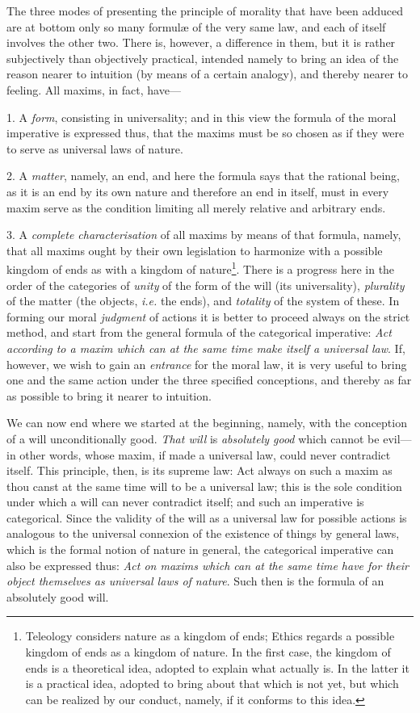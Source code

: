 The three modes of presenting the principle of morality that have been
adduced are at bottom only so many formul\ae{} of the very same law,
and each of itself involves the other two. There is, however, a
difference in them, but it is rather subjectively than objectively
practical, intended namely to bring an idea of the reason nearer to
intuition (by means of a certain analogy), and thereby nearer to
feeling. All maxims, in fact, have---

1. A \textit{form}, consisting in universality; and in this view the
formula of the moral imperative is expressed thus, that the maxims
must be so chosen as if they were to serve as universal laws of
nature.

2. A \textit{matter}, namely, an end, and here the formula
says that the rational being, as it is an end by its own nature and
therefore an end in itself, must in every maxim serve as the condition
limiting all merely relative and arbitrary ends.

3. A \textit{complete characterisation} of all maxims by means of that
formula, namely, that all maxims ought by their own legislation to
harmonize with a possible kingdom of ends as with a kingdom of
nature\footnote{Teleology considers nature as a kingdom of ends;
Ethics regards a possible kingdom of ends as a kingdom of nature. In
the first case, the kingdom of ends is a theoretical idea, adopted to
explain what actually is. In the latter it is a practical idea,
adopted to bring about that which is not yet, but which can be
realized by our conduct, namely, if it conforms to this idea.}. There
is a progress here in the order of the categories of \textit{unity} of
the form of the will (its universality), \textit{plurality} of the
matter (the objects, \textit{i.e.} the ends), and \textit{totality} of
the system of these. In forming our moral \textit{judgment} of actions
it is better to proceed always on the strict method, and start from
the general formula of the categorical imperative: \textit{Act
according to a maxim which can at the same time make itself a
universal law}. If, however, we wish to gain an \textit{entrance} for
the moral law, it is very useful to bring one and the same action
under the three specified conceptions, and thereby as far as possible
to bring it nearer to intuition.

We can now end where we started at the beginning, namely, with the
conception of a will unconditionally good. \textit{That will} is
\textit{absolutely good} which cannot be evil---in other words, whose
maxim, if made a universal law, could never contradict itself. This
principle, then, is its supreme law: Act always on such a maxim as
thou canst at the same time will to be a universal law; this is the
sole condition under which a will can never contradict itself; and
such an imperative is categorical. Since the validity of the will as a
universal law for possible actions is analogous to the universal
connexion of the existence of things by general laws, which is the
formal notion of nature in general,  the categorical
imperative can also be expressed thus: \textit{Act on maxims which can
at the same time have for their object themselves as universal laws of
nature}. Such then is the formula of an absolutely good will.

